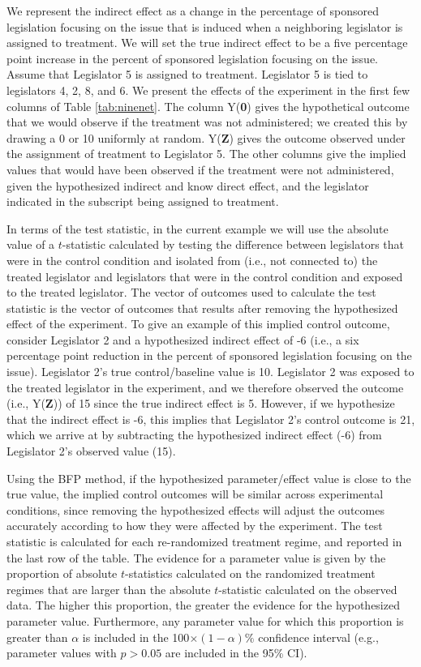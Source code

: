\documentclass[12pt]{article}
\begin{document}
We represent the indirect effect as a change in the percentage of sponsored legislation focusing on the issue that is induced when a neighboring legislator is assigned to treatment. We will set the true indirect effect to be a five percentage point increase in the percent of sponsored legislation focusing on the issue. Assume that Legislator 5 is assigned to treatment. Legislator 5 is tied to legislators 4, 2, 8, and 6. We present the effects of the experiment in the first few columns of Table \ref{tab:ninenet}. The column Y({\bf 0}) gives the hypothetical outcome that we would observe if the treatment was not administered; we created this by drawing a 0 or 10 uniformly at random. Y({\bf Z}) gives the outcome observed under the assignment of treatment to Legislator 5. The other columns give the implied values that would have been observed if the treatment were not administered, given the hypothesized indirect and know direct effect, and the legislator indicated in the subscript being assigned to treatment. 

In terms of the test statistic, in the current example we will use the absolute value of a $t$-statistic calculated by testing the difference between legislators that were in the control condition and isolated from (i.e., not connected to) the treated legislator and legislators that were in the control condition and exposed to the treated legislator. The vector of outcomes used to calculate the test statistic is the vector of outcomes that results after removing the hypothesized effect of the experiment. To give an example of this implied control outcome, consider Legislator 2 and a hypothesized indirect effect of -6 (i.e., a six percentage point reduction in the percent of sponsored legislation focusing on the issue). Legislator 2's true control/baseline value is 10. Legislator 2 was exposed to the treated legislator in the experiment, and we therefore observed the outcome (i.e., Y({\bf Z})) of 15 since the true indirect effect is 5. However, if we hypothesize that the indirect effect is -6, this implies that Legislator 2's control outcome is 21, which we arrive at by subtracting the hypothesized indirect effect (-6) from Legislator 2's observed value (15). 

Using the BFP method, if the hypothesized parameter/effect value is close to the true value, the implied control outcomes will be similar across experimental conditions, since removing the hypothesized effects will adjust the outcomes accurately according to how they were affected by the experiment. The test statistic is calculated for each re-randomized treatment regime, and reported in the last row of the table. The evidence for a parameter value is given by the proportion of absolute $t$-statistics calculated on the randomized treatment regimes that are larger than the absolute $t$-statistic calculated on the observed data. The higher this proportion, the greater the evidence for the hypothesized parameter value. Furthermore, any parameter value for which this proportion is greater than $\alpha$ is included in the 100$\times(1-\alpha)\%$ confidence interval (e.g., parameter values with $p > 0.05$ are included in the 95\% CI). 
\end{document}
